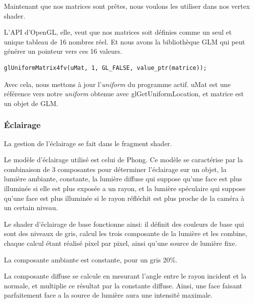 \documentclass[pdftex, 11pt, a4paper, titlepage]{article}
\begin{document}
Maintenant que nos matrices sont prêtes, nous voulons les utiliser
dans nos vertex shader.

L'API d'OpenGL, elle, veut que nos matrices soit définies comme
un seul et unique tableau de 16 nombres réel. Et nous avons la
bibliothèque GLM qui peut générer un pointeur vers ces 16 valeurs.

\begin{lstlisting}
glUniformMatrix4fv(uMat, 1, GL_FALSE, value_ptr(matrice));
\end{lstlisting}

Avec cela, nous mettons à jour l'\emph{uniform} du programme actif.
uMat est une référence vers notre \emph{uniform} obtenue avec glGetUniformLocation,
et matrice est un objet de GLM.
\pagebreak
\subsubsection{Éclairage}

La gestion de l'éclairage se fait dans le fragment shader.

Le modèle d'éclairage utilisé est celui de Phong. Ce modèle se caractérise par
la combinaison de 3 composantes pour déterminer l'éclairage sur un objet,
la lumière ambiante, constante, la lumière diffuse qui suppose qu'une face
est plus illuminée si elle est plus exposée a un rayon, et la lumière 
spéculaire qui suppose qu'une face est plus illuminée si le rayon réfléchit
 est plus proche de la caméra à un certain niveau.

Le shader d'éclairage de base fonctionne ainsi: il définit des couleurs de
 base qui sont des niveaux de gris, calcul les trois composante de la lumière
 et les combine, chaque calcul étant réalisé pixel par pixel, 
ainsi qu'une source de lumière fixe.

La composante ambiante est constante, pour un gris 20\%.

La composante diffuse se calcule en mesurant l'angle entre le rayon incident
 et la normale, et multiplie ce résultat par la constante diffuse. 
Ainsi, une face faisant parfaitement face a la source de lumière aura
 une intensité maximale.
\end{document}
